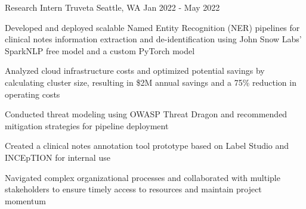 
\begin{cventries}
	\cventry
	{Research Intern}
	{Truveta}
	{Seattle, WA}
	{Jan 2022 - May 2022}
	{\begin{cvitems}
			\item {Developed and deployed scalable Named Entity Recognition (NER) pipelines for clinical notes information extraction and de-identification using John Snow Labs' SparkNLP free model and a custom PyTorch model}
			\item {Analyzed cloud infrastructure costs and optimized potential savings by calculating cluster size, resulting in \$2M annual savings and a 75\% reduction in operating costs}
			\item {Conducted threat modeling using OWASP Threat Dragon and recommended mitigation strategies for pipeline deployment}
			\item {Created a clinical notes annotation tool prototype based on Label Studio and INCEpTION for internal use}
			\item {Navigated complex organizational processes and collaborated with multiple stakeholders to ensure timely access to resources and maintain project momentum}
		\end{cvitems}}


\end{cventries}
